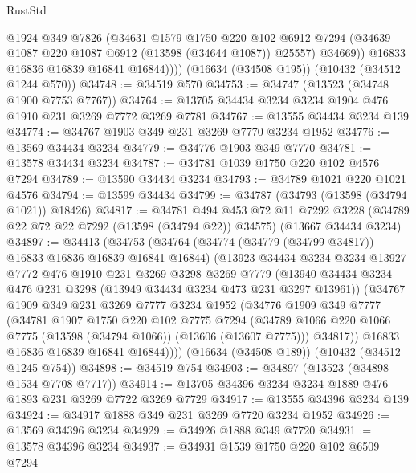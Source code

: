\begin{lexlean}{RustStd}
\begin{coremodule}
              @1924
              @349
              @7826
              (@34631
                @1579
                @1750
                @220
                @102
                @6912
                @7294
                (@34639 @1087 @220 @1087 @6912 (@13598 (@34644 @1087)) @25557)
                @34669))
            @16833
            @16836
            @16839
            @16841
            @16844))))
    (@16634 (@34508 @195))
    (@10432 (@34512 @1244 @570))
@34748 := @34519 @570
@34753 := @34747 (@13523 (@34748 @1900 @7753 @7767))
@34764 := @13705 @34434 @3234 @3234 @1904 @476 @1910 @231 @3269 @7772 @3269 @7781
@34767 := @13555 @34434 @3234 @139
@34774 := @34767 @1903 @349 @231 @3269 @7770 @3234 @1952
@34776 := @13569 @34434 @3234
@34779 := @34776 @1903 @349 @7770
@34781 := @13578 @34434 @3234
@34787 := @34781 @1039 @1750 @220 @102 @4576 @7294
@34789 := @13590 @34434 @3234
@34793 := @34789 @1021 @220 @1021 @4576
@34794 := @13599 @34434
@34799 := @34787 (@34793 (@13598 (@34794 @1021)) @18426)
@34817 := @34781
    @494
    @453
    @72
    @11
    @7292
    @3228
    (@34789 @22 @72 @22 @7292 (@13598 (@34794 @22)) @34575)
    (@13667 @34434 @3234)
@34897 := @34413
    (@34753
      (@34764
        (@34774 (@34779 (@34799 @34817)) @16833 @16836 @16839 @16841 @16844)
        (@13923
          @34434
          @3234
          @3234
          @13927
          @7772
          @476
          @1910
          @231
          @3269
          @3298
          @3269
          @7779
          (@13940 @34434 @3234 @476 @231 @3298 (@13949 @34434 @3234 @473 @231 @3297 @13961))
          (@34767
            @1909
            @349
            @231
            @3269
            @7777
            @3234
            @1952
            (@34776
              @1909
              @349
              @7777
              (@34781
                @1907
                @1750
                @220
                @102
                @7775
                @7294
                (@34789 @1066 @220 @1066 @7775 (@13598 (@34794 @1066)) (@13606 (@13607 @7775)))
                @34817))
            @16833
            @16836
            @16839
            @16841
            @16844))))
    (@16634 (@34508 @189))
    (@10432 (@34512 @1245 @754))
@34898 := @34519 @754
@34903 := @34897 (@13523 (@34898 @1534 @7708 @7717))
@34914 := @13705 @34396 @3234 @3234 @1889 @476 @1893 @231 @3269 @7722 @3269 @7729
@34917 := @13555 @34396 @3234 @139
@34924 := @34917 @1888 @349 @231 @3269 @7720 @3234 @1952
@34926 := @13569 @34396 @3234
@34929 := @34926 @1888 @349 @7720
@34931 := @13578 @34396 @3234
@34937 := @34931 @1539 @1750 @220 @102 @6509 @7294

\end{coremodule}
\end{lexlean}
